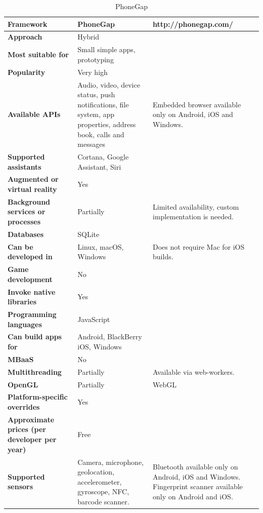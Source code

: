 \documentclass[english,master,public,dept460,male,cpdeclaration,oneside]{diploma}
\begin{document}
\begin{table}[!h]
	\centering
	\caption{PhoneGap}
	\begin{tabular}{p{} | p{} | p{}}
		\toprule		
		\textbf{Framework} & \textbf{PhoneGap} & http://phonegap.com/ \\
		\midrule
		\textbf{Approach} & Hybrid & \\			
		\midrule	
		\textbf{Most suitable for} & Small simple apps, prototyping & \\
		\midrule
		\textbf{Popularity} & Very high & \\			
		\midrule
		\textbf{Available APIs} & Audio, video, device status, push notifications, file system, app properties, address book, calls and messages & Embedded browser available only on Android, iOS and Windows. \\			
		\midrule
		\textbf{Supported assistants} & Cortana, Google Assistant, Siri & \\			
		\midrule
		\textbf{Augmented or virtual reality} & Yes & \\			
		\midrule
		\textbf{Background services or processes} & Partially & Limited availability, custom implementation is needed. \\			
		\midrule
		\textbf{Databases} & SQLite & \\			
		\midrule
		\textbf{Can be developed in} & Linux, macOS, Windows & Does not require Mac for iOS builds. \\			
		\midrule
		\textbf{Game development} & No & \\			
		\midrule
		\textbf{Invoke native libraries} & Yes & \\			
		\midrule
		\textbf{Programming languages} & JavaScript & \\			
		\midrule
		\textbf{Can build apps for} & Android, BlackBerry iOS, Windows & \\			
		\midrule
		\textbf{MBaaS} & No & \\			
		\midrule
		\textbf{Multithreading} & Partially & Available via web-workers. \\			
		\midrule
		\textbf{OpenGL} & Partially & WebGL \\			
		\midrule
		\textbf{Platform-specific overrides} & Yes & \\			
		\midrule
		\textbf{Approximate prices (per developer per year)} & Free & \\			
		\midrule
		\textbf{Supported sensors} & Camera, microphone, geolocation, accelerometer, gyroscope, NFC, barcode scanner. & Bluetooth available only on Android, iOS and Windows. Fingerprint scanner available only on Android and iOS. \\			
		\midrule
	\end{tabular}
\end{table}
\end{document}
